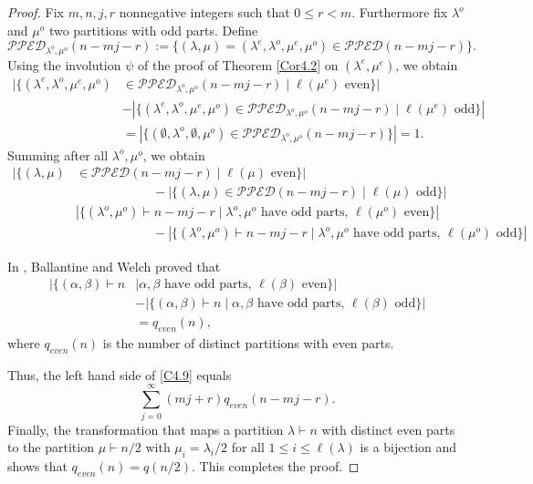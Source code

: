 \documentclass{amsart}
\theoremstyle{definition}
\begin{document}
\begin{proof}
Fix $m, n, j, r$ nonnegative integers  such that $0\leq r<m$. 
Furthermore fix $\lambda^o$ and $\mu^o$ two partitions with odd parts. Define $$\mathcal{PPED}_{\lambda^o, \mu^o}(n-mj-r):=\{(\lambda, \mu)=(\lambda^e, \lambda^o, \mu^e, \mu^o)\in \mathcal{PPED}(n-mj-r)\}.$$
Using the involution $\psi$ of the proof of Theorem \ref{Cor4.2} on $(\lambda^e, \mu^e)$, we obtain \begin{align*}|\{(\lambda^e, \lambda^o,  \mu^e, \mu^o) & \in\mathcal{PPED}_{\lambda^o,\mu^o}(n-mj-r)\mid \ell(\mu^e) \text{ even}\}|\\&  -|\{(\lambda^e, \lambda^o,  \mu^e, \mu^o)  \in\mathcal{PPED}_{\lambda^o, \mu^o}(n-mj-r)\mid \ell(\mu^e) \text{ odd}\}|\\ & = |\{( \emptyset,\lambda^o, \emptyset,\mu^o) \in \mathcal{PPED}_{\lambda^o, \mu^o}(n-mj-r)\}|=1.\end{align*}
Summing after all $\lambda^o,\mu^o$, we obtain \begin{align*}|\{(\lambda, \mu)& \in  \mathcal{PPED}(n-mj-r) \mid \ell(\mu) \text{ even}\}|\\  &\qquad \qquad\qquad- |\{(\lambda, \mu)\in  \mathcal{PPED}(n-mj-r) \mid \ell(\mu) \text{ odd}\}|\\ & |\{(\lambda^o, \mu^o)\vdash n-mj-r \mid \lambda^o, \mu^o \text{ have odd parts, } \ell(\mu^o) \text{ even}\}|\\ & \qquad \qquad\qquad- |\{(\lambda^o, \mu^o)\vdash n-mj-r \mid \lambda^o, \mu^o \text{ have odd parts, } \ell(\mu^o) \text{ odd}\}|
\end{align*}



In \cite[Proposition 4]{BW}, Ballantine and Welch proved that \begin{align*}|\{(\alpha, \beta)\vdash n &  \mid \alpha, \beta \text{ have odd parts, } \ell(\beta) \text{ even}\}|\\ & -|\{(\alpha, \beta)\vdash n \mid \alpha, \beta \text{ have odd parts, } \ell(\beta) \text{ odd}\}| \\ & = q_{even}(n), \end{align*} where $q_{even}(n)$ is the number of distinct partitions with even parts. 


Thus, the left hand side of \eqref{C4.9} equals $$\sum_{j=0}^\infty (mj+r)q_{even}(n-mj-r).$$ Finally, the transformation that maps a partition $\lambda\vdash n$ with distinct even parts to the partition $\mu\vdash n/2$ with $\mu_i=\lambda_i/2$ for all $1\leq i\leq \ell(\lambda)$ is a bijection and shows that $q_{even}(n)=q(n/2)$. This completes the proof. \end{proof}
\end{document}
